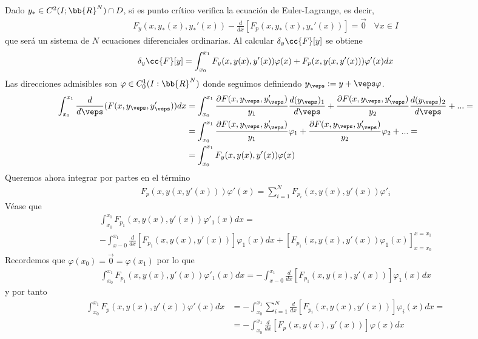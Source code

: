 Dado $y_*\in C^2(I;\bb{R}^N)\cap D$, si es punto crítico verifica la ecuación de Euler-Lagrange, es decir, 
\begin{gather*}
    F_y(x,y_*(x), y_*'(x)) - \frac{d}{dx} [F_p(x,y_*(x), y_*'(x))] = \vec{0}\ \ \ \ \forall x \in I
\end{gather*}
que será un sistema de $N$ ecuaciones diferenciales ordinarias. Al calcular $\delta_y\cc{F}[y]$ se obtiene 
 \begin{gather*}
    \delta_y\cc{F}[y] = \int_{x_0}^{x_1} F_y(x,y(x), y'(x)) \varphi(x) + F_p(x,y(x, y'(x))) \varphi'(x) dx
 \end{gather*}
 Las direcciones admisibles son $\varphi \in C_0^1(I:\bb{R}^N)$ donde seguimos definiendo $y_\veps := y + \veps \varphi$.
 \begin{align*}
    \int_{x_0}^{x_1} \frac{d}{d\veps}(F(x,y_\veps, y'_\veps)) dx &= \int_{x_0}^{x_1} \frac{\partial F(x,y_\veps, y'_\veps)}{y_1} \frac{d(y_\veps)_1}{d \veps} + \frac{\partial F(x,y_\veps, y'_\veps)}{y_2} \frac{d(y_\veps)_2}{d \veps} + ... = \\
    &= \int_{x_0}^{x_1} \frac{\partial F(x,y_\veps, y'_\veps)}{y_1} \varphi_1 + \frac{\partial F(x,y_\veps, y'_\veps)}{y_2} \varphi_2 + ... = \\
    &= \int_{x_0}^{x_1} F_y(x,y(x), y'(x)) \varphi(x)
 \end{align*}
 Queremos ahora integrar por partes en el término
 \begin{gather*}
    F_p(x,y(x, y'(x))) \varphi'(x) = \sum_{i=1}^{N}F_{p_i}(x, y(x), y'(x))\varphi'_i
 \end{gather*}
 Véase que 
 \begin{gather*}
    \int_{x_0}^{x_1} F_{p_1}(x, y(x), y'(x)) \varphi'_1(x) dx = \\
    - \int_{x-0}^{x_1} \frac{d}{dx} [F_{p_1}(x,y(x), y'(x))]\varphi_1(x) dx + \left[ F_{p_1}(x,y(x), y'(x)) \varphi_1(x)\right]_{x=x_0}^{x=x_1} 
 \end{gather*}
 Recordemos que $\varphi(x_0) = \vec{0} = \varphi(x_1)$ por lo que 
 \begin{gather*}
    \int_{x_0}^{x_1} F_{p_1}(x, y(x), y'(x)) \varphi'_1(x) dx =
    - \int_{x-0}^{x_1} \frac{d}{dx} [F_{p_1}(x,y(x), y'(x))]\varphi_1(x) dx
 \end{gather*}
 y por tanto 
 \begin{align*}
    \int_{x_0}^{x_1} F_p(x, y(x), y'(x)) \varphi'(x) dx &= - \int_{x_0}^{x_1} \sum_{i=1}^N \frac{d}{dx} [F_{p_i}(x, y(x), y'(x))] \varphi_i(x) dx =\\
    &= -\int_{x_0}^{x_1} \frac{d}{dx} [F_p(x, y(x), y'(x))]\varphi(x) dx
 \end{align*}

